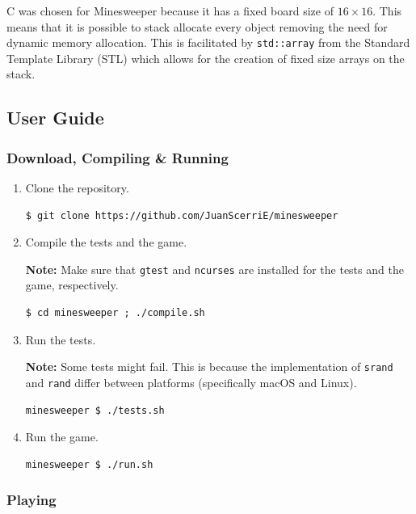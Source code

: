 \documentclass[12pt]{article}
\def\cpp{{C\nolinebreak[4]\hspace{-.05em}\raisebox{.4ex}{\tiny\bf ++}}}
\begin{document}
\cpp{} was chosen for Minesweeper because it has a fixed board
size of $16 \times 16$. This means that it is possible to stack
allocate every object removing the need for dynamic memory
allocation. This is facilitated by \texttt{std::array} from the
Standard Template Library (STL) which allows for the creation of
fixed size arrays on the stack.

\subsection{User Guide}

\subsubsection{Download, Compiling \& Running}

\begin{enumerate}
\item
    Clone the repository.
\begin{lstlisting}
$ git clone https://github.com/JuanScerriE/minesweeper
\end{lstlisting}

\item
    Compile the tests and the game.

    \textbf{Note:} Make sure that \texttt{gtest} and
    \texttt{ncurses} are installed for the tests and the game,
    respectively.
\begin{lstlisting}
$ cd minesweeper ; ./compile.sh
\end{lstlisting}

\item
    Run the tests.

    \textbf{Note:} Some tests might fail. This is because the
    implementation of \texttt{srand} and \texttt{rand} differ
    between platforms (specifically macOS and Linux).
\begin{lstlisting}
minesweeper $ ./tests.sh
\end{lstlisting}

\item
    Run the game.
\begin{lstlisting}
minesweeper $ ./run.sh
\end{lstlisting}

\end{enumerate}

\subsubsection{Playing}
\end{document}
